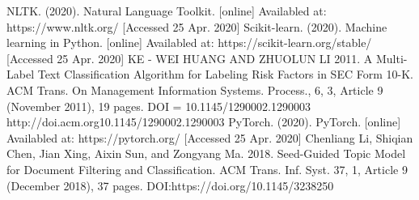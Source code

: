\documentclass[12pt]{report}
\begin{document}
\begin{thebibliography}{9}
NLTK. (2020). Natural Language Toolkit. [online] Availabled at: https://www.nltk.org/ [Accessed 25 Apr. 2020]
Scikit-learn. (2020). Machine learning in Python. [online] Availabled at: https://scikit-learn.org/stable/ [Accessed 25 Apr. 2020]
KE - WEI HUANG AND ZHUOLUN LI 2011. A Multi-Label Text Classification Algorithm for Labeling Risk Factors in SEC Form 10-K. ACM Trans. On Management Information Systems. Process., 6, 3, Article 9 (November 2011), 19 pages. DOI = 10.1145/1290002.1290003 http://doi.acm.org10.1145/1290002.1290003
PyTorch. (2020). PyTorch. [online] Availabled at: https://pytorch.org/ [Accessed 25 Apr. 2020]
Chenliang Li, Shiqian Chen, Jian Xing, Aixin Sun, and Zongyang Ma. 2018. Seed-Guided Topic Model for Document Filtering and Classification. ACM Trans. Inf. Syst. 37, 1, Article 9 (December 2018), 37 pages. DOI:https://doi.org/10.1145/3238250
\end{thebibliography}
\end{document}
